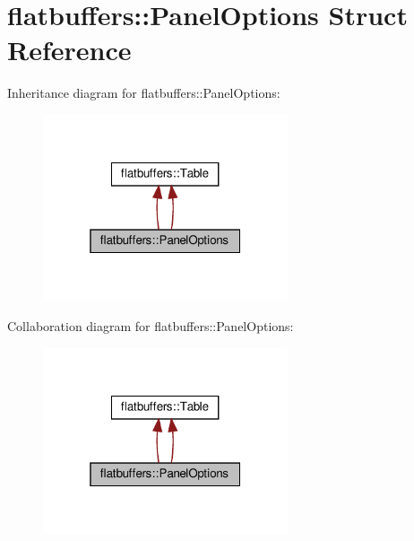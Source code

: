 \hypertarget{structflatbuffers_1_1PanelOptions}{}\section{flatbuffers\+:\+:Panel\+Options Struct Reference}
\label{structflatbuffers_1_1PanelOptions}


Inheritance diagram for flatbuffers\+:\+:Panel\+Options\+:
\nopagebreak
\begin{figure}[H]
\begin{center}
\leavevmode
\includegraphics[width=205pt]{structflatbuffers_1_1PanelOptions__inherit__graph}
\end{center}
\end{figure}


Collaboration diagram for flatbuffers\+:\+:Panel\+Options\+:
\nopagebreak
\begin{figure}[H]
\begin{center}
\leavevmode
\includegraphics[width=205pt]{structflatbuffers_1_1PanelOptions__coll__graph}
\end{center}
\end{figure}
